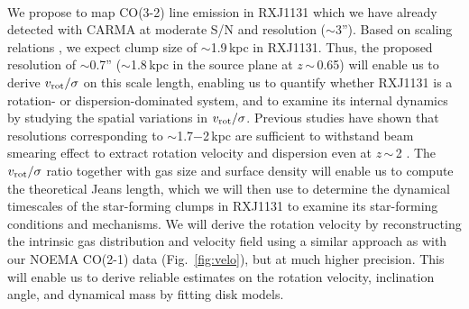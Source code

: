 \documentclass[11pt,a4paper,twoside,graphicx,color]{article}
\newcommand{\vs}{$v_{\rm rot}/\sigma$\xspace}
\newcommand{\bco}{\mbox{CO(2-1)}\xspace}
\newcommand{\cco}{\mbox{CO(3-2)}\xspace}
\newcommand{\Fig}[1]{Fig.~\ref{fig:#1}}
\newcommand{\ssim}{\,$\sim$\,}
\newcommand{\highz}{high-$z$\xspace}
\begin{document}
\vspace{0.2em}
 \\ 
\indent 
We propose to map \cco line emission in RXJ1131
which we have already detected with CARMA at moderate S/N and resolution ($\sim$3'').
Based on scaling relations 
\citep{Genzel11a}, %
we expect clump size of %
$\sim$1.9\,kpc in RXJ1131. %
Thus, the proposed resolution of $\sim$0.7'' ($\sim$1.8\,kpc in the source plane at $z$\ssim0.65) will enable us to derive \vs
on this scale length, enabling us to quantify whether RXJ1131 is a rotation- or dispersion-dominated system, 
and to examine its internal dynamics by studying the spatial variations in \vs.
Previous studies have shown that resolutions corresponding to $\sim$1.7$-$2\,kpc are sufficient to withstand %
beam smearing effect to extract rotation velocity and 
dispersion even at $z$\ssim2  \citep[e.g.][]{Newman13a, Genzel14a}.
The \vs ratio together with gas size and surface density will enable us to compute the theoretical Jeans length, 
which we will then use to determine the dynamical timescales of the star-forming clumps in RXJ1131
to examine its star-forming conditions and mechanisms.
%
We will derive the rotation velocity by reconstructing the intrinsic gas distribution and velocity field using 
a similar approach as with our NOEMA \bco data (\Fig{velo}), but at much higher precision.
This will enable us to derive reliable estimates on the rotation velocity, inclination angle, and
dynamical mass by fitting disk models.
 
\end{document}

